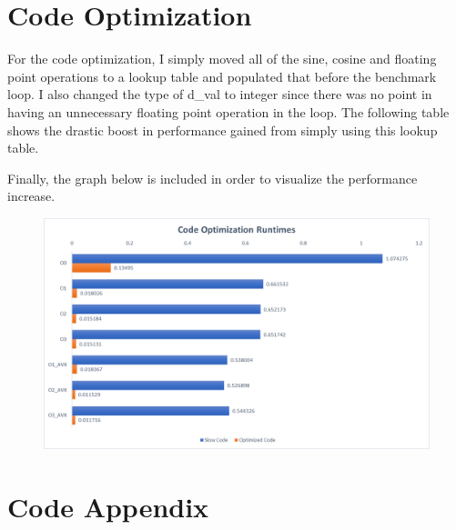 \documentclass[a4paper, 11pt]{article}
\begin{document}
\newpage
\section*{Code Optimization}
For the code optimization, I simply moved all of the sine, cosine and floating point operations to a lookup table and populated that before the benchmark loop. I also changed the type of d\_val to integer since there was no point in having an unnecessary floating point operation in the loop. The following table shows the drastic boost in performance gained from simply using this lookup table.
 

 
Finally, the graph below is included in order to visualize the performance increase.
\begin{figure}[H]
	\centering
	\includegraphics[width=6in]{optimization_runtimes.png}
\end{figure}

\newpage
\section*{Code Appendix}

\end{document}
